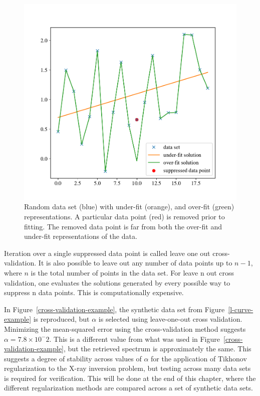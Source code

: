 \begin{figure}[p]
    \centering
    \includegraphics[width=1.0\textwidth]{figures/chapter_4/cross_validation_motivation/cross_validation_motivation.pdf}
    \caption{Random data set (blue) with under-fit (orange), and over-fit (green) representations. A particular data point (red) is removed prior to fitting. The removed data point is far from both the over-fit and under-fit representations of the data. }
    \label{cross_validation_motivation}
\end{figure}

Iteration over a single suppressed data point is called leave one out cross-validation. It is also possible to leave out any number of data points up to $n-1$, where $n$ is the total number of points in the data set. For leave n out cross validation, one evaluates the solutions generated by every possible way to suppress n data points. This is computationally expensive. 

In Figure~\ref{cross-validation-example}, the synthetic data set from Figure~\ref{l-curve-example} is reproduced, but $\alpha$ is selected using leave-one-out cross validation. Minimizing the mean-squared error using the cross-validation method suggests $\alpha=7.8\times10^-2.$ This is a different value from what was used in Figure~\ref{cross-validation-example}, but the retrieved spectrum is approximately the same. This suggests a degree of stability across values of $\alpha$ for the application of Tikhonov regularization to the X-ray inversion problem, but testing across many data sets is required for verification. This will be done at the end of this chapter, where the different regularization methods are compared across a set of synthetic data sets. 

